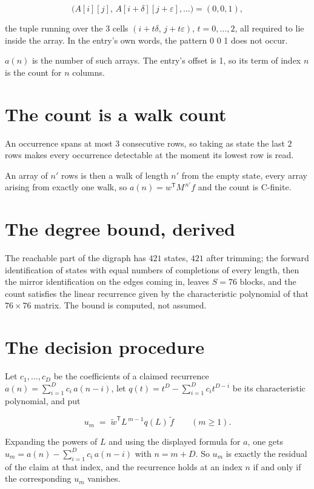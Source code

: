 \documentclass[11pt]{article}
\theoremstyle{definition}
\begin{document}
\[\bigl(A[i][j],\,A[i{+}\delta][j{+}\varepsilon],\dots\bigr) = (0, 0, 1),\]

the tuple running over the $3$ cells $(i+t\delta,\,j+t\varepsilon)$, $t = 0,\dots,2$, all required to lie inside the array. In the entry's own words, the pattern 0 0 1 does not occur.

$a(n)$ is the number of such arrays. The entry's offset is 1, so its term of index $n$ is the count for $n$ columns.

\section{The count is a walk count}

An occurrence spans at most $3$ consecutive rows, so taking as state the last $2$ rows makes every occurrence detectable at the moment its lowest row is read.

An array of $n'$ rows is then a walk of length $n'$ from the empty state, every array arising from exactly one walk, so $a(n) = w^{\mathsf T}M^{\,n'}f$ and the count is C-finite.

\section{The degree bound, derived}

The reachable part of the digraph has $421$ states, $421$ after trimming; the forward identification of states with equal numbers of completions of every length, then the mirror identification on the edges coming in, leaves $S = 76$ blocks, and the count satisfies the linear recurrence given by the characteristic polynomial of that $76\times76$ matrix. The bound is computed, not assumed.

\section{The decision procedure}

Let $c_1,\dots,c_D$ be the coefficients of a claimed recurrence $a(n) = \sum_{i=1}^{D} c_i\,a(n-i)$, let $q(t) = t^{D} - \sum_{i=1}^{D} c_i t^{D-i}$ be its characteristic polynomial, and put

\[u_m \;=\; \tilde w^{\mathsf T} L^{\,m-1} q(L)\,\tilde f \qquad (m \ge 1).\]

Expanding the powers of $L$ and using the displayed formula for $a$, one gets $u_m = a(n) - \sum_{i=1}^{D} c_i\,a(n-i)$ with $n = m + D$. So $u_m$ is exactly the residual of the claim at that index, and the recurrence holds at an index $n$ if and only if the corresponding $u_m$ vanishes.
\end{document}
